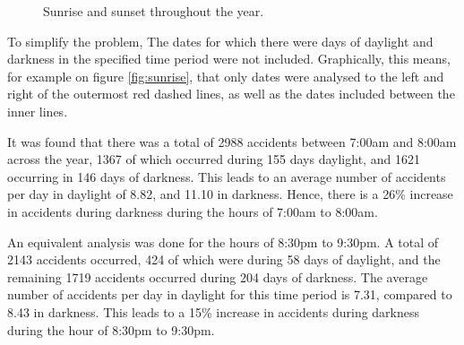 \documentclass[12pt]{article}
\begin{document}
\begin{figure}[h]
\centering     %
{}
\caption{Sunrise and sunset throughout the year.}
\label{sunrise-sunset}
\end{figure}

To simplify the problem, The dates for which there were days of daylight and darkness in the specified time period were not included. Graphically, this means, for example on figure \ref{fig:sunrise}, that only dates were analysed to the left and right of the outermost red dashed lines, as well as the dates included between the inner lines.

It was found that there was a total of 2988 accidents between 7:00am and 8:00am across the year, 1367 of which occurred during 155 days daylight, and 1621 occurring in 146 days of darkness. This leads to an average number of accidents per day in daylight of 8.82, and 11.10 in darkness. Hence, there is a 26\% increase in accidents during darkness during the hours of 7:00am  to 8:00am.

An equivalent analysis was done for the hours of 8:30pm to 9:30pm. A total of 2143 accidents occurred, 424 of which were during 58 days of daylight, and the remaining 1719 accidents occurred during 204 days of darkness. The average number of accidents per day in daylight for this time period is 7.31, compared to 8.43 in darkness. This leads to a 15\% increase in accidents during darkness during the hour of 8:30pm to 9:30pm.
\end{document}
